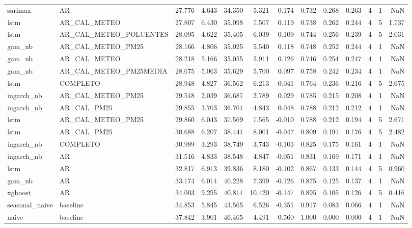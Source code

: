 \begin{tabular}{llrrrrrrrrrrr}
sarimax & AR & 27.776 & 4.643 & 34.350 & 5.321 & 0.174 & 0.732 & 0.268 & 0.263 & 4 & 1 & NaN \\
lstm & AR_CAL_METEO & 27.807 & 6.430 & 35.098 & 7.507 & 0.119 & 0.738 & 0.262 & 0.244 & 4 & 5 & 1.737 \\
lstm & AR_CAL_METEO_POLUENTES & 28.095 & 4.622 & 35.405 & 6.039 & 0.109 & 0.744 & 0.256 & 0.239 & 4 & 5 & 2.031 \\
gam_nb & AR_CAL_METEO_PM25 & 28.166 & 4.806 & 35.025 & 5.540 & 0.118 & 0.748 & 0.252 & 0.244 & 4 & 1 & NaN \\
gam_nb & AR_CAL_METEO & 28.218 & 5.166 & 35.055 & 5.911 & 0.126 & 0.746 & 0.254 & 0.247 & 4 & 1 & NaN \\
gam_nb & AR_CAL_METEO_PM25MEDIA & 28.675 & 5.063 & 35.629 & 5.700 & 0.097 & 0.758 & 0.242 & 0.234 & 4 & 1 & NaN \\
lstm & COMPLETO & 28.948 & 4.827 & 36.562 & 6.213 & 0.041 & 0.764 & 0.236 & 0.216 & 4 & 5 & 2.675 \\
ingarch_nb & AR_CAL_METEO_PM25 & 29.548 & 2.039 & 36.687 & 2.789 & 0.029 & 0.785 & 0.215 & 0.208 & 4 & 1 & NaN \\
ingarch_nb & AR_CAL_PM25 & 29.855 & 3.703 & 36.704 & 4.843 & 0.048 & 0.788 & 0.212 & 0.212 & 4 & 1 & NaN \\
lstm & AR_CAL_METEO_PM25 & 29.860 & 6.043 & 37.569 & 7.565 & -0.010 & 0.788 & 0.212 & 0.194 & 4 & 5 & 2.671 \\
lstm & AR_CAL_PM25 & 30.688 & 6.207 & 38.444 & 8.001 & -0.047 & 0.809 & 0.191 & 0.176 & 4 & 5 & 2.482 \\
ingarch_nb & COMPLETO & 30.989 & 3.293 & 38.749 & 3.743 & -0.103 & 0.825 & 0.175 & 0.161 & 4 & 1 & NaN \\
ingarch_nb & AR & 31.516 & 4.833 & 38.548 & 4.847 & -0.051 & 0.831 & 0.169 & 0.171 & 4 & 1 & NaN \\
lstm & AR & 32.817 & 6.913 & 39.836 & 8.180 & -0.102 & 0.867 & 0.133 & 0.144 & 4 & 5 & 0.960 \\
gam_nb & AR & 33.174 & 6.014 & 40.228 & 7.399 & -0.126 & 0.875 & 0.125 & 0.137 & 4 & 1 & NaN \\
xgboost & AR & 34.003 & 9.295 & 40.814 & 10.420 & -0.147 & 0.895 & 0.105 & 0.126 & 4 & 5 & 0.416 \\
seasonal_naive & baseline & 34.853 & 5.845 & 43.565 & 6.526 & -0.351 & 0.917 & 0.083 & 0.066 & 4 & 1 & NaN \\
naive & baseline & 37.842 & 3.901 & 46.465 & 4.491 & -0.560 & 1.000 & 0.000 & 0.000 & 4 & 1 & NaN \\
\bottomrule
\end{tabular}
